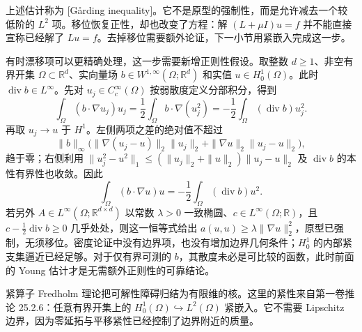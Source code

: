 上述估计称为 [Gårding inequality]。它不是原型的强制性，而是允许减去一个较低阶的 \(L^2\) 项。移位恢复正性，却也改变了方程：解 \((L+\mu I)u=f\) 并不能直接宣称已经解了 \(Lu=f\)。去掉移位需要额外论证，下一小节用紧嵌入完成这一步。

\ProseParagraphBreak

有时漂移项可以更精确处理，这一步需要新增正则性假设。取整数 \(d\geq1\)、非空有界开集 \(\Omega\subset\mathbb R^d\)、实向量场 \(b\in W^{1,\infty}(\Omega;\mathbb R^d)\) 和实值 \(u\in H_0^1(\Omega)\)。此时 \(\operatorname{div}b\in L^\infty\)。先对 \(u_j\in C_c^\infty(\Omega)\) 按弱散度定义分部积分，得到
\[
 \int_\Omega(b\cdot\nabla u_j)u_j
 =\frac12\int_\Omega b\cdot\nabla(u_j^2)
 =-\frac12\int_\Omega(\operatorname{div}b)u_j^2.
\]
再取 \(u_j\to u\) 于 \(H^1\)。左侧两项之差的绝对值不超过
\[
 \|b\|_\infty\bigl(
 \|\nabla(u_j-u)\|_2\|u_j\|_2+
 \|\nabla u\|_2\|u_j-u\|_2\bigr),
\]
趋于零；右侧利用 \(\|u_j^2-u^2\|_1\leq(\|u_j\|_2+\|u\|_2)\|u_j-u\|_2\) 及 \(\operatorname{div}b\) 的本性有界性也收敛。因此
\[
 \int_\Omega(b\cdot\nabla u)u
 =-\frac12\int_\Omega(\operatorname{div}b)u^2.
\]
若另外 \(A\in L^\infty(\Omega;\mathbb R^{d\times d})\) 以常数 \(\lambda>0\) 一致椭圆、\(c\in L^\infty(\Omega;\mathbb R)\)，且 \(c-\tfrac12\operatorname{div}b\geq0\) 几乎处处，则这一恒等式给出 \(a(u,u)\geq\lambda\|\nabla u\|_2^2\)，原型已强制，无须移位。密度论证中没有边界项，也没有增加边界几何条件；\(H_0^1\) 的内部紧支集逼近已经足够。对于仅有界可测的 \(b\)，其散度未必是可比较的函数，此时前面的 Young 估计才是无需额外正则性的可靠结论。


紧算子 Fredholm 理论把可解性障碍归结为有限维的核。这里的紧性来自第一卷推论 25.2.6：任意有界开集上的 \(H_0^1(\Omega)\hookrightarrow L^2(\Omega)\) 紧嵌入。它不需要 Lipschitz 边界，因为零延拓与平移紧性已经控制了边界附近的质量。

